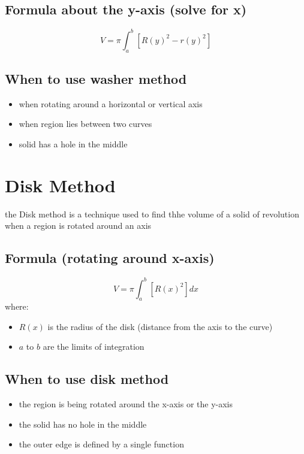 \documentclass{article}
\begin{document}
                             \subsection{Formula about the y-axis (solve for x)}
                                \[V = \pi \int_{a}^{b} [{R(y)}^2 - {r(y)}^2]\]
                            \subsection{When to use washer method}
                                \begin{itemize}
                                    \item when rotating around a horizontal or vertical axis
                                    \item when region lies between two curves 
                                    \item solid has a hole in the middle
                                \end{itemize}
                \section{Disk Method}
                        the Disk method is a technique used to find thhe volume of a solid of revolution when a region is rotated around an axis
                        \subsection{Formula (rotating around x-axis)}
                            \[V = \pi \int_{a}^{b} [{R(x)}^2]dx\]
                            where: 
                            \begin{itemize}
                                \item \(R(x)\) is the radius of the disk (distance from the axis to the curve)
                                \item \(a\) to \(b\) are the limits of integration
                            \end{itemize}
                        \subsection{When to use disk method}
                            \begin{itemize}
                                \item the region is being rotated around the x-axis or the y-axis 
                                \item the solid has no hole in the middle 
                                \item the outer edge is defined by a single function 
                            \end{itemize}
\end{document}
